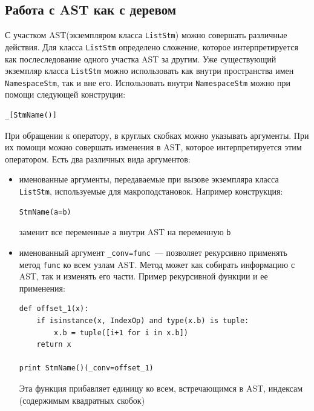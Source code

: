 \subsection{Работа с AST как с деревом}
С участком AST(экземпляром класса \verb"ListStm") можно совершать различные действия. Для класса \verb"ListStm" определено сложение, которое интерпретируется как послеследование одного участка AST за другим. Уже существующий экземпляр класса \verb"ListStm" можно использовать как внутри пространства имен \verb"NamespaceStm", так и вне его. Использовать внутри \verb"NamespaceStm" можно при помощи следующей конструции:
\begin{verbatim}
_[StmName()] 
\end{verbatim}
При обращении к оператору, в круглых скобках можно указывать аргументы. При их помощи можно совершать изменения в AST, которое интерпретируется этим оператором. Есть два различных вида аргументов:
\begin{itemize}
    \item именованные аргументы, передаваемые при вызове экземпляра класса \verb"ListStm", используемые для макроподстановок. Например конструкция:
    \begin{verbatim}
StmName(a=b)
    \end{verbatim}
заменит все переменные \verb"a" внутри AST на переменную \verb"b"
    \item именованный аргумент \verb"_conv=func"~--- позволяет рекурсивно применять метод \verb"func" ко всем узлам AST. Метод может как собирать информацию с AST, так и изменять его части. Пример рекурсивной функции и ее применения:
    \begin{verbatim}
def offset_1(x):
    if isinstance(x, IndexOp) and type(x.b) is tuple:
        x.b = tuple([i+1 for i in x.b])
    return x

print StmName()(_conv=offset_1)    
    \end{verbatim}
    Эта функция прибавляет единицу ко всем, встречающимся в AST, индексам (содержимым квадратных скобок)
\end{itemize}
\[
    
\]